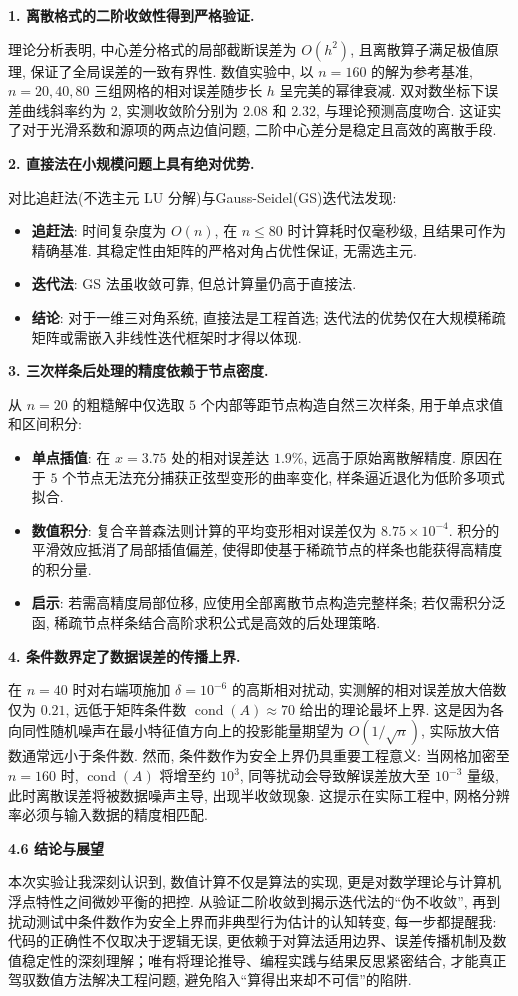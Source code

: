 \documentclass[zihao=-4,a4paper]{ctexart}
\begin{document}
\textbf{1. 离散格式的二阶收敛性得到严格验证.}

理论分析表明, 中心差分格式的局部截断误差为 $O(h^2)$, 且离散算子满足极值原理, 保证了全局误差的一致有界性. 数值实验中, 以 $n=160$ 的解为参考基准, $n=20,40,80$ 三组网格的相对误差随步长 $h$ 呈完美的幂律衰减. 双对数坐标下误差曲线斜率约为 $2$, 实测收敛阶分别为 $2.08$ 和 $2.32$, 与理论预测高度吻合. 这证实了对于光滑系数和源项的两点边值问题, 二阶中心差分是稳定且高效的离散手段. 

\textbf{2. 直接法在小规模问题上具有绝对优势.}

对比追赶法(不选主元 LU 分解)与Gauss-Seidel(GS)迭代法发现: 
\begin{itemize}[rightmargin=0.5cm]
    \item \textbf{追赶法}: 时间复杂度为 $O(n)$, 在 $n \leq 80$ 时计算耗时仅毫秒级, 且结果可作为精确基准. 其稳定性由矩阵的严格对角占优性保证, 无需选主元. 
    \item \textbf{迭代法}: GS 法虽收敛可靠, 但总计算量仍高于直接法. 
    \item \textbf{结论}: 对于一维三对角系统, 直接法是工程首选; 迭代法的优势仅在大规模稀疏矩阵或需嵌入非线性迭代框架时才得以体现. 
\end{itemize}

\textbf{3. 三次样条后处理的精度依赖于节点密度.}

从 $n=20$ 的粗糙解中仅选取 $5$ 个内部等距节点构造自然三次样条, 用于单点求值和区间积分: 
\begin{itemize}[rightmargin=0.5cm]
    \item \textbf{单点插值}: 在 $x=3.75$ 处的相对误差达 $1.9\%$, 远高于原始离散解精度. 原因在于 $5$ 个节点无法充分捕获正弦型变形的曲率变化, 样条逼近退化为低阶多项式拟合. 
    \item \textbf{数值积分}: 复合辛普森法则计算的平均变形相对误差仅为 $8.75\times10^{-4}$. 积分的平滑效应抵消了局部插值偏差, 使得即使基于稀疏节点的样条也能获得高精度的积分量. 
    \item \textbf{启示}: 若需高精度局部位移, 应使用全部离散节点构造完整样条; 若仅需积分泛函, 稀疏节点样条结合高阶求积公式是高效的后处理策略. 
\end{itemize}

\textbf{4. 条件数界定了数据误差的传播上界.}

在 $n=40$ 时对右端项施加 $\delta=10^{-6}$ 的高斯相对扰动, 实测解的相对误差放大倍数仅为 $0.21$, 远低于矩阵条件数 $\operatorname{cond}(A)\approx 70$ 给出的理论最坏上界. 这是因为各向同性随机噪声在最小特征值方向上的投影能量期望为 $O(1/\sqrt{n})$, 实际放大倍数通常远小于条件数. 然而, 条件数作为安全上界仍具重要工程意义: 当网格加密至 $n=160$ 时, $\operatorname{cond}(A)$ 将增至约 $10^3$, 同等扰动会导致解误差放大至 $10^{-3}$ 量级, 此时离散误差将被数据噪声主导, 出现半收敛现象. 这提示在实际工程中, 网格分辨率必须与输入数据的精度相匹配. 

\noindent\textbf{4.6 结论与展望}

本次实验让我深刻认识到, 数值计算不仅是算法的实现, 更是对数学理论与计算机浮点特性之间微妙平衡的把控. 从验证二阶收敛到揭示迭代法的“伪不收敛”, 再到扰动测试中条件数作为安全上界而非典型行为估计的认知转变, 每一步都提醒我: 代码的正确性不仅取决于逻辑无误, 更依赖于对算法适用边界、误差传播机制及数值稳定性的深刻理解；唯有将理论推导、编程实践与结果反思紧密结合, 才能真正驾驭数值方法解决工程问题, 避免陷入“算得出来却不可信”的陷阱. 
\end{document}
